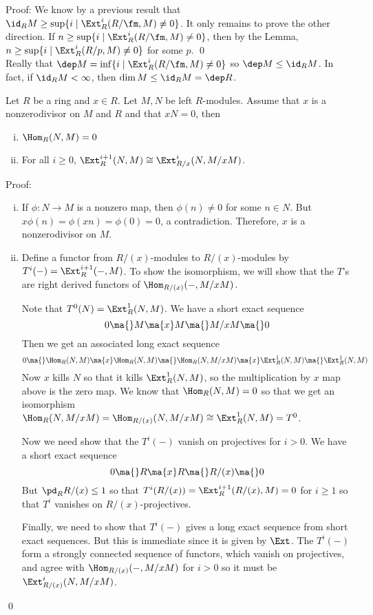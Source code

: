 \noindent Proof: We know by a previous result that $\id_R M \geq \sup\{i\;|\; \Ext_R^i(R/\fm,M) \neq 0\}$. It only remains to prove the other direction. If $n \geq \sup\{i\;|\; \Ext_R^i(R/\fm,M) \neq 0\}$, then by the Lemma, $n \geq \sup\{i\;|\; \Ext_R^i(R/p,M) \neq 0\}$ for some $p$. \qed \\

Really that $\dep M=\inf\{i\;|\; \Ext_R^i(R/\fm,M) \neq 0\}$ so $\dep M \leq \id_R M$. In fact, if $\id_R M <\infty$, then $\dim M \leq \id_R M=\dep R$. 

\begin{lem}
Let $R$ be a ring and $x \in R$. Let $M,N$ be left $R$-modules. Assume that $x$ is a nonzerodivisor on $M$ and $R$ and that $xN=0$, then 
\begin{enumerate}[(i)]
\item $\Hom_R(N,M)=0$
\item For all $i \geq 0$, $\Ext_R^{i+1}(N,M) \cong \Ext^i_{R/x}(N,M/xM)$. 
\end{enumerate}
\end{lem}

\noindent Proof:
\begin{enumerate}[(i)]
\item If $\phi: N \to M$ is a nonzero map, then $\phi(n) \neq 0$ for some $n \in N$. But $x\phi(n)=\phi(xn)=\phi(0)=0$, a contradiction. Therefore, $x$ is a nonzerodivisor on $M$.
\item Define a functor from $R/(x)$-modules to $R/(x)$-modules by $T^i(-)=\Ext_R^{i+1}(-,M)$. To show the isomorphism, we will show that the $T$'s are right derived functors of $\Hom_{R/(x)}(-,M/xM)$. 

Note that $T^0(N)=\Ext_R^1(N,M)$. We have a short exact sequence
\[
0 \ma{} M \ma{x} M \ma{} M/xM \ma{} 0
\]
Then we get an associated long exact sequence
\[
0 \ma{} \Hom_R(N,M) \ma{x} \Hom_R(N,M) \ma{} \Hom_R(N,M/xM) \ma{x} \Ext_R^1(N,M) \ma{} \Ext_R^1(N,M)
\]
Now $x$ kills $N$ so that it kills $\Ext_R^1(N,M)$, so the multiplication by $x$ map above is the zero map. We know that $\Hom_R(N,M)=0$ so that we get an isomorphism $\Hom_R(N,M/xM)=\Hom_{R/(x)}(N,M/xM) \cong \Ext_R^1(N,M) =T^0$.

Now we need show that the $T^i(-)$ vanish on projectives for $i>0$. We have a short exact sequence
\[
0 \ma{} R \ma{x} R \ma{} R/(x) \ma{} 0 
\]
But $\pd_R R/(x) \leq 1$ so that $T^i(R/(x))=\Ext_R^{i+1}(R/(x),M)=0$ for $i \geq 1$ so that $T^i$ vanishes on $R/(x)$-projectives. 

Finally, we need to show that $T^i(-)$ gives a long exact sequence from short exact sequences. But this is immediate since it is given by $\Ext$. The $T^i(-)$ form a strongly connected sequence of functors, which vanish on projectives, and agree with $\Hom_{R/(x)}(-,M/xM)$ for $i>0$ so it must be $\Ext^i_{R/(x)}(N,M/xM)$. 
\end{enumerate}
\qed \\

